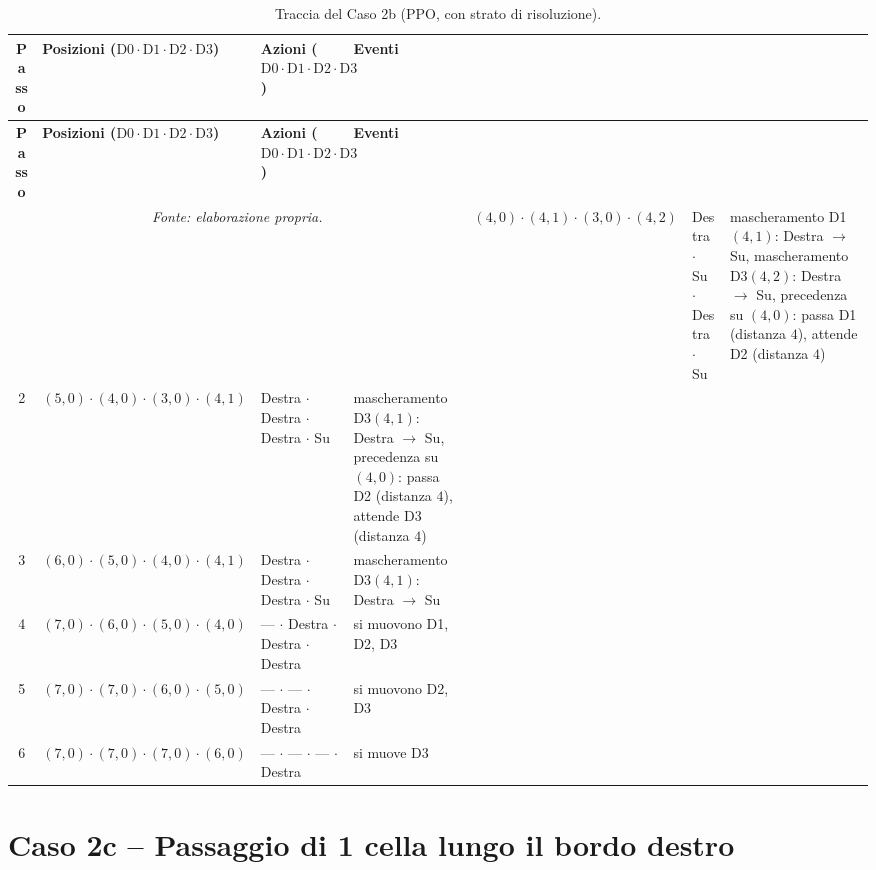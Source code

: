 \documentclass[12pt,a4paper,twoside]{report}
\begin{document}
{\footnotesize
\setlength{\tabcolsep}{3.5pt}
\begin{longtable}{c l l >{\raggedright\arraybackslash}p{3.8cm}}
\caption{Traccia del Caso 2b (PPO, con strato di risoluzione).}\\
\toprule
\textbf{Passo} & \textbf{Posizioni ($\text{D0} \cdot \text{D1} \cdot \text{D2} \cdot \text{D3}$)} & \textbf{Azioni ($\text{D0} \cdot \text{D1} \cdot \text{D2} \cdot \text{D3}$)} & \textbf{Eventi} \\
\midrule
\endfirsthead
\toprule
\textbf{Passo} & \textbf{Posizioni ($\text{D0} \cdot \text{D1} \cdot \text{D2} \cdot \text{D3}$)} & \textbf{Azioni ($\text{D0} \cdot \text{D1} \cdot \text{D2} \cdot \text{D3}$)} & \textbf{Eventi} \\
\midrule
\endhead
\bottomrule
\multicolumn{4}{c}{\footnotesize\emph{Fonte: elaborazione propria.}}
\endlastfoot
1 & $(4, 0) \cdot (4, 1) \cdot (3, 0) \cdot (4, 2)$ & Destra $\cdot$ Su $\cdot$ Destra $\cdot$ Su     & mascheramento D1$(4, 1)$: Destra $\to$ Su, mascheramento D3$(4, 2)$: Destra $\to$ Su, precedenza su $(4, 0)$: passa D1 (distanza $4$), attende D2 (distanza $4$) \\
2 & $(5, 0) \cdot (4, 0) \cdot (3, 0) \cdot (4, 1)$ & Destra $\cdot$ Destra $\cdot$ Destra $\cdot$ Su & mascheramento D3$(4, 1)$: Destra $\to$ Su, precedenza su $(4, 0)$: passa D2 (distanza $4$), attende D3 (distanza $4$) \\
3 & $(6, 0) \cdot (5, 0) \cdot (4, 0) \cdot (4, 1)$ & Destra $\cdot$ Destra $\cdot$ Destra $\cdot$ Su & mascheramento D3$(4, 1)$: Destra $\to$ Su \\
4 & $(7, 0) \cdot (6, 0) \cdot (5, 0) \cdot (4, 0)$ & --- $\cdot$ Destra $\cdot$ Destra $\cdot$ Destra & si muovono D1, D2, D3 \\
5 & $(7, 0) \cdot (7, 0) \cdot (6, 0) \cdot (5, 0)$ & --- $\cdot$ --- $\cdot$ Destra $\cdot$ Destra   & si muovono D2, D3 \\*
6 & $(7, 0) \cdot (7, 0) \cdot (7, 0) \cdot (6, 0)$ & --- $\cdot$ --- $\cdot$ --- $\cdot$ Destra      & si muove D3 \\*
\end{longtable}
}

\newpage
\section{Caso 2c -- Passaggio di 1 cella lungo il bordo destro}
\label{sec:app_caso_2c}
\end{document}

